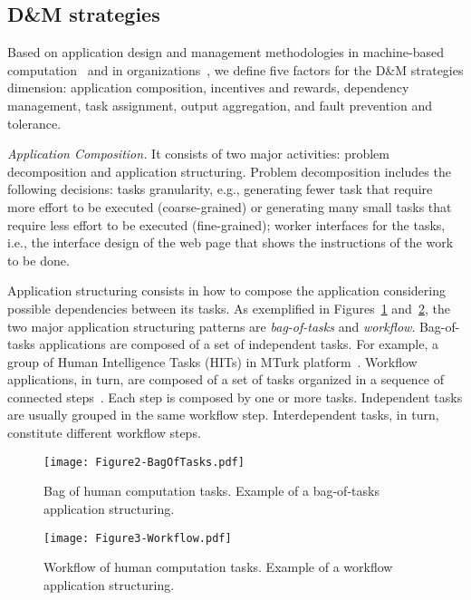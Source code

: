 \documentclass[11pt]{bmc_article_s50}
\begin{document}
\subsection{D\&M strategies}

Based on application design and management methodologies in machine-based computation~\cite{Cardoso:2002,Yu:2005,cirne:2003} and in organizations~\cite{Kumar:2002,Kiepuszewski:2000}, we define five factors for the D\&M strategies dimension: application composition, incentives and rewards, dependency management, task assignment, output aggregation, and fault prevention and tolerance.

\textit{Application Composition.} It consists of two major activities: problem decomposition and application structuring. Problem decomposition includes the following decisions:  tasks granularity, e.g., generating fewer task that require more effort to be executed (coarse-grained) or generating many small tasks that require less effort to be executed (fine-grained);  worker interfaces for the tasks, i.e., the interface design of the web page that shows the instructions of the work to be done.

Application structuring consists in how to compose the application considering possible dependencies between its tasks. As exemplified in Figures~\ref{fig2} and~\ref{fig3}, the two major application structuring patterns are \textit{bag-of-tasks} and \textit{workflow}. Bag-of-tasks applications are composed of a set of independent tasks. For example, a group of Human Intelligence Tasks (HITs) in MTurk platform~\cite{Little2010}. Workflow applications, in turn, are composed of a set of tasks organized in a sequence of connected steps~\cite{Christoph:2012}. Each step is composed by one or more tasks. Independent tasks are usually grouped in the same workflow step. Interdependent tasks, in turn, constitute different workflow steps.

\begin{figure}[!h]
\centering
\texttt{[image: Figure2-BagOfTasks.pdf]}
\caption{Bag of human computation tasks.
Example of a bag-of-tasks application structuring.}
\label{fig2}
\end{figure}

\begin{figure}[!h]
\centering
\texttt{[image: Figure3-Workflow.pdf]}
\caption{Workflow of human computation tasks.
Example of a workflow application structuring.}
\label{fig3}
\end{figure}
\end{document}
